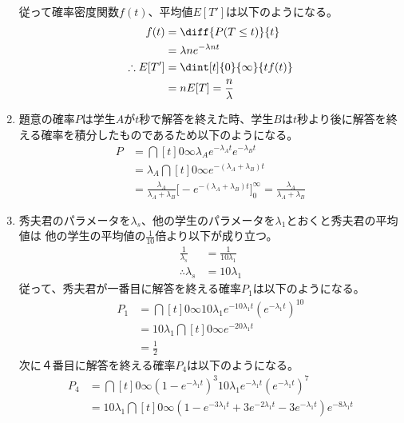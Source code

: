 \documentclass[dvipdfmx,titlepage, 11pt, a4paper]{jsarticle}%
\begin{document}
\begin{enumerate}[(1)]
\begin{align*}
        \end{align*}
        従って確率密度関数$f(t)$、平均値$E[T']$は以下のようになる。
        \begin{align*}
            f(t) &= \diff{P(T \leq t)}{t}\\
            &= \lambda n e^{- \lambda n t}\\
            \therefore E[T'] &= \dint[t]{0}{\infty}{tf(t)}\\
            &= n E[T] = \frac{n}{\lambda}\\
        \end{align*}
    \item 題意の確率$P$は学生$A$が$t$秒で解答を終えた時、学生$B$は$t$秒より後に解答を終える確率を積分したものであるため以下のようになる。
        \begin{align*}
            P &= \dint[t]{0}{\infty}{\lambda_Ae^{-\lambda_A t}e^{-\lambda_B t}}\\
            &= \lambda_A \dint[t]{0}{\infty}{e^{-(\lambda_A + \lambda_B)t}}\\
            &= \frac{\lambda_A}{\lambda_A + \lambda_B} \bigl[-e^{-(\lambda_A + \lambda_B)t}\bigr]_{0}^{\infty} 
            = \frac{\lambda_A}{\lambda_A + \lambda_B} 
        \end{align*}
    \item 秀夫君のパラメータを$\lambda_s$、他の学生のパラメータを$\lambda_1$とおくと秀夫君の平均値は
    他の学生の平均値の$\frac{1}{10}$倍より以下が成り立つ。
        \begin{align*}
            \frac{1}{\lambda_s} &= \frac{1}{10\lambda_1}\\
            \therefore \lambda_s &= 10\lambda_1
        \end{align*}
        従って、秀夫君が一番目に解答を終える確率$P_1$は以下のようになる。
        \begin{align*}
            P_1 &= \dint[t]{0}{\infty}{10\lambda_1 e^{-10\lambda_1 t}\left(e^{-\lambda_1 t}\right)^{10}}\\
            &= 10\lambda_1 \dint[t]{0}{\infty}{e^{-20\lambda_1 t}}\\
            &= \frac{1}{2}
        \end{align*}
        次に４番目に解答を終える確率$P_4$は以下のようになる。
        \begin{align*}
            P_4 &= \dint[t]{0}{\infty}{\left(1 - e^{-\lambda_1 t}\right)^{3}10\lambda_1 e^{-\lambda_1 t}\left(e^{-\lambda_1 t}\right)^{7}}\\
            &= 10\lambda_1 \dint[t]{0}{\infty}{\left(1 - e^{-3\lambda_1 t} + 3e^{-2\lambda_1 t} - 3e^{-\lambda_1 t}\right)e^{-8\lambda_1 t}}\\

\end{align*}
\end{enumerate}
\end{document}
